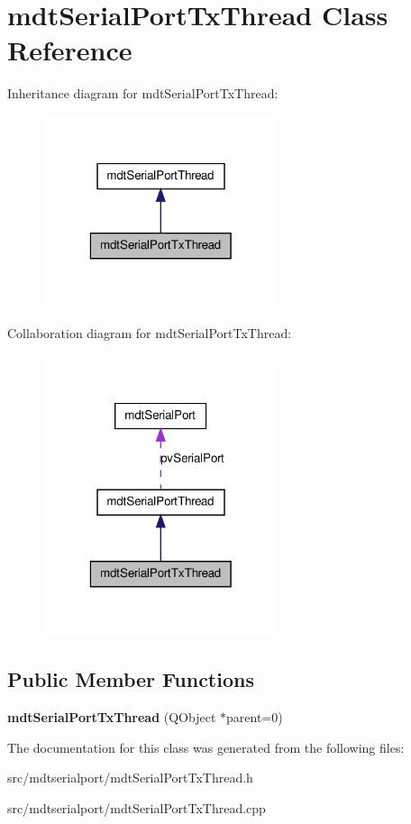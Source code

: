 \hypertarget{classmdt_serial_port_tx_thread}{
\section{mdtSerialPortTxThread Class Reference}
\label{classmdt_serial_port_tx_thread}
}


Inheritance diagram for mdtSerialPortTxThread:\nopagebreak
\begin{figure}[H]
\begin{center}
\leavevmode
\includegraphics[width=196pt]{classmdt_serial_port_tx_thread__inherit__graph}
\end{center}
\end{figure}


Collaboration diagram for mdtSerialPortTxThread:\nopagebreak
\begin{figure}[H]
\begin{center}
\leavevmode
\includegraphics[width=196pt]{classmdt_serial_port_tx_thread__coll__graph}
\end{center}
\end{figure}
\subsection*{Public Member Functions}
\begin{DoxyCompactItemize}
\item 
\hypertarget{classmdt_serial_port_tx_thread_ac274b30407cc617137945ab7d89f4d8b}{
{\bfseries mdtSerialPortTxThread} (QObject $\ast$parent=0)}
\label{classmdt_serial_port_tx_thread_ac274b30407cc617137945ab7d89f4d8b}

\end{DoxyCompactItemize}


The documentation for this class was generated from the following files:\begin{DoxyCompactItemize}
\item 
src/mdtserialport/mdtSerialPortTxThread.h\item 
src/mdtserialport/mdtSerialPortTxThread.cpp\end{DoxyCompactItemize}
